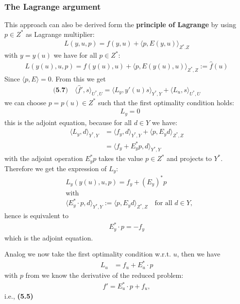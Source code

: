 \subsubsection*{The Lagrange argument}
	This approach can also be derived form the \textbf{principle of Lagrange }by using $p \in Z^*$ as Lagrange multiplier:  
	\begin{align*}
		L(y, u, p)= f(y, u) + \langle p, E(y, u) \rangle_{Z^*. Z}
	\end{align*} 
	with $y = y(u)$ we have for all $ p \in Z^*$:
	\begin{align*}
		L(y(u), u, p) = f(y(u), u) + \langle p, E(y(u), u) \rangle_{Z^*, Z} := \hat{f}(u)
	\end{align*}
	Since $\langle p, E \rangle = 0$.  From this we get 
	\begin{align*}\textbf{(5.7)}\quad 
		\langle \hat{f}', s \rangle_{U^*, U} = \langle L_y, y'(u)s\rangle_{Y^*, Y} + \langle L_u, s \rangle_{U^*, U}
	\end{align*}
	we can choose $p= p(u) \in Z^*$ such that the first optimality condition holds:  
	\begin{align*} \quad
		L_y = 0
	\end{align*}
	this is the adjoint equation, because for all $d \in Y$ we have:
	\begin{align*}
		\langle L_y, d \rangle_{Y^*, Y} &= \langle f_y, d \rangle_{Y^*, Y} + \langle p, E_y d \rangle_{Z^*, Z }\\
		&= \langle f_y + E_y^* p , d \rangle_{Y^*, Y}
	\end{align*}
	with the adjoint operation $E_y^* p$ takes the value $p \in Z^*$ and projects to $Y^*$. Therefore we get the expression of $L_y$:
	\begin{align*}
		& L_y(y(u), u, p) = f_y + (E_y)^* p \\
		& \text{with} \\
		&  \langle E_y^* \cdot p, d \rangle_{Y^*, Y}  := \langle p, E_y d  \rangle_{Z^*, Z} \quad \text{for all } d \in Y,
	\end{align*}
	hence  is equivalent to 
	\begin{align*}
		E_y^* \cdot  p = - f_y
	\end{align*}
	which is the adjoint equation.\par 
	Analog we now take the first optimality condition w.r.t. $u$, then we have 
	\begin{align*}
		L_u &= f_u + E_u^* \cdot  p 
	\end{align*}
	with $p$ from  we know the derivative of the reduced problem: 
	\begin{align*}
		\hat{f}' = E_u^* \cdot  p + f_u,
	\end{align*}
	i.e., \textbf{(5.5)}


